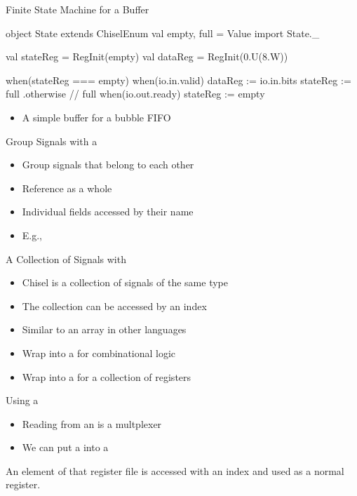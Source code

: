 \begin{frame}[fragile]{Finite State Machine for a Buffer}
\begin{chisel}
  object State extends ChiselEnum {
    val empty, full = Value
  }
  import State._

  val stateReg = RegInit(empty)
  val dataReg = RegInit(0.U(8.W))

  when(stateReg === empty) {
    when(io.in.valid) {
      dataReg := io.in.bits
      stateReg := full
    }
  } .otherwise { // full
    when(io.out.ready) {
      stateReg := empty
    }
  }
\end{chisel}
\begin{itemize}
\item A simple buffer for a bubble FIFO
\end{itemize}
\end{frame}


\begin{frame}[fragile]{Group Signals with a }
\begin{itemize}
\item Group signals that belong to each other
\item Reference as a whole
\item Individual fields accessed by their name
\item E.g., 
\end{itemize}
\end{frame}

\begin{frame}[fragile]{A Collection of Signals with }
\begin{itemize}
\item Chisel  is a collection of signals of the same type
\item The collection can be accessed by an index
\item Similar to an array in other languages
\item Wrap into a  for combinational logic
\item Wrap into a  for a collection of registers
\end{itemize}
\end{frame}

\begin{frame}[fragile]{Using a }
\begin{itemize}
\item Reading from an  is a multplexer
\item We can put a  into a 
\end{itemize}
\noindent An element of that register file is accessed with an index and used as a normal register.

\end{frame}


